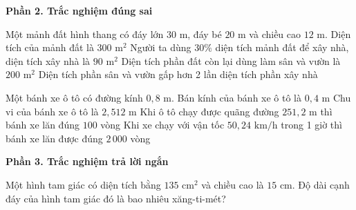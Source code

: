 \textbf{Phần 2. Trắc nghiệm đúng sai}

\begin{ex} %
Một mảnh đất hình thang có đáy lớn $30\text{ m}$, đáy bé $20\text{ m}$ và chiều cao $12\text{ m}$.
\choiceTF
{\True Diện tích của mảnh đất là $300\text{ m}^2$}
{\True Người ta dùng $30\%$ diện tích mảnh đất để xây nhà, diện tích xây nhà là $90\text{ m}^2$}
{Diện tích phần đất còn lại dùng làm sân và vườn là $200\text{ m}^2$}
{\True Diện tích phần sân và vườn gấp hơn 2 lần diện tích phần xây nhà}
\end{ex}

\begin{ex} %
Một bánh xe ô tô có đường kính $0{,}8\text{ m}$.
\choiceTF
{\True Bán kính của bánh xe ô tô là $0{,}4\text{ m}$}
{\True Chu vi của bánh xe ô tô là $2{,}512\text{ m}$}
{\True Khi ô tô chạy được quãng đường $251{,}2\text{ m}$ thì bánh xe lăn đúng $100$ vòng}
{Khi xe chạy với vận tốc $50{,}24\text{ km/h}$ trong 1 giờ thì bánh xe lăn được đúng $2\,000$ vòng}
\end{ex}

\textbf{Phần 3. Trắc nghiệm trả lời ngắn}

\begin{ex} %
Một hình tam giác có diện tích bằng $135\text{ cm}^2$ và chiều cao là $15\text{ cm}$. Độ dài cạnh đáy của hình tam giác đó là bao nhiêu xăng-ti-mét?
\end{ex}

